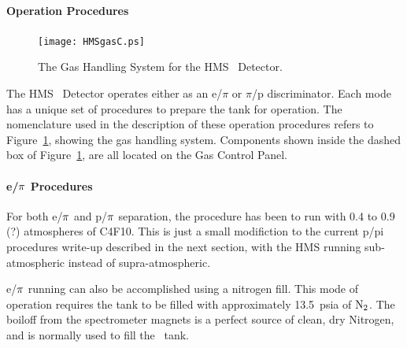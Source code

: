 \paragraph{Operation Procedures}

\begin{figure}
\texttt{[image: HMSgasC.ps]}
\caption{The Gas Handling System for the HMS \Cerenkov\ Detector. \label{fig:gas}}
\end{figure}

The HMS \Cerenkov\ Detector operates either as an e/$\pi$ or $\pi$/p
discriminator. Each mode has a unique set of procedures to prepare the tank
for operation. The nomenclature used in the description of these operation
procedures refers to Figure~\ref{fig:gas}, showing the gas handling system. Components 
shown
inside the dashed box of Figure~\ref{fig:gas}, are all located on the Gas Control Panel.

\paragraph{e/$\bf{\pi}$ Procedures}
For both e/$\bf{\pi}$ and p/$\bf{\pi}$ separation, the procedure 
has been to run with 0.4 to
0.9 (?) atmospheres of C4F10.  This is just a small modifiction to the
current p/pi procedures write-up described in the next section,
with the HMS running sub-atmospheric instead of supra-atmospheric. 

e/$\bf{\pi}$ running can also be accomplished using a nitrogen fill.
This mode of operation requires the tank to be filled with approximately
13.5~psia of $\rm{N_2}$.  The boiloff from the spectrometer magnets is a
perfect source of clean, dry Nitrogen, and is normally used to fill the
\Cerenkov\ tank.

